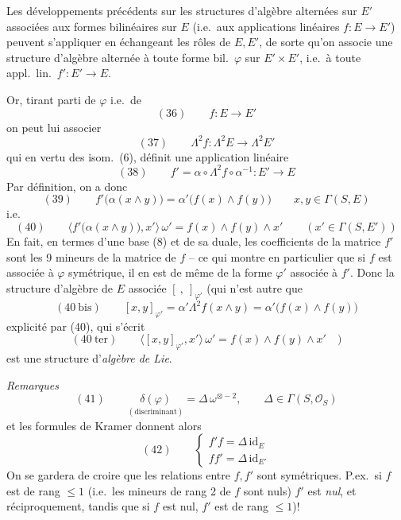 \documentclass[11pt,a4paper]{article}
\begin{document}
Les développements précédents sur les structures d'algèbre alternées sur $E'$
associées aux formes bilinéaires sur $E$ (i.e.\ aux applications linéaires
$f : E \to E'$) peuvent s'appliquer en échangeant les rôles de $E, E'$, de
sorte qu'on associe une structure d'algèbre alternée  à toute forme
bil.\ $\varphi$ sur $E' \times E'$, i.e.\ à toute appl.\ lin.\ $f' : E' \to E$.

Or, tirant parti de $\varphi$ i.e.\ de
\[
  (36) \qquad f : E \longrightarrow E'
\]
on peut lui associer
\[
  (37) \qquad \Lambda^2 f : \Lambda^2 E \longrightarrow \Lambda^2 E'
\]
qui en vertu des isom.\ (6), définit une application linéaire
\[
  (38) \qquad f' = \alpha \circ \Lambda^2 f \circ \alpha^{-1} : E' \longrightarrow E
\]
 Par définition, on a donc
\[
  (39) \qquad f'\bigl(\alpha(x \wedge y)\bigr) = \alpha'\bigl(f(x) \wedge f(y)\bigr) \qquad x, y \in \Gamma(S, E)
\]
i.e.
\[
  (40) \qquad \bigl\langle f'\bigl(\alpha(x \wedge y)\bigr), x' \bigr\rangle\, \omega' = f(x) \wedge f(y) \wedge x' \qquad (x' \in \Gamma(S, E'))
\]
En fait, en termes d'une base (8) et de sa duale, les coefficients de la matrice
$f'$ sont les 9 mineurs de la matrice de $f$ -- ce qui montre en particulier que
si $f$   est associée à $\varphi$ symétrique, il en est de même
de la forme $\varphi'$ associée à $f'$. Donc la structure d'algèbre de $E$ associée
$[\ ,\ ]_{\varphi'}$ (qui n'est autre que
\[
  (40\ \text{bis}) \qquad [x, y]_{\varphi'} = \alpha'\Lambda^2 f(x \wedge y) = \alpha'\bigl(f(x) \wedge f(y)\bigr)
\]
explicité par (40), qui s'écrit
\[
  (40\ \text{ter}) \qquad \bigl\langle [x, y]_{\varphi'}, x' \bigr\rangle\, \omega' = f(x) \wedge f(y) \wedge x' \quad )
\]
est  une structure d'\emph{algèbre de Lie}.

\emph{Remarques} 
\[
  (41) \qquad \underset{(\text{discriminant})}{\delta(\varphi)} = \Delta\, \omega^{\otimes -2} , \qquad \Delta \in \Gamma(S, \mathcal{O}_S)
\]
et les formules de Kramer donnent alors
\[
  (42) \qquad
  \begin{cases}
    f'f = \Delta\, \mathrm{id}_E \\
    ff' = \Delta\, \mathrm{id}_{E'}
  \end{cases}
\]
On se gardera de croire que les relations entre $f, f'$ sont symétriques. P.ex.\
si $f$ est de rang $\leq 1$ (i.e.\ les mineurs de rang 2 de $f$ sont nuls) $f'$
est \emph{nul}, et réciproquement, tandis que si $f$ est nul, $f'$ est
\ill{} \ill{} \ill{} \ill{} de rang $\leq 1$)!
\end{document}
